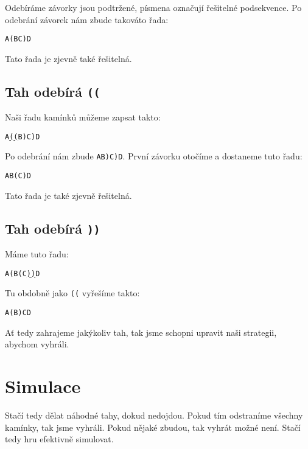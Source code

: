 \documentclass{article}
\newcommand{\bredl}{{\color{Maroon}(}}
\newcommand{\bredr}{{\color{Maroon})}}
\begin{document}
Odebíráme závorky jsou podtržené, písmena označují řešitelné podsekvence. Po odebrání závorek nám zbude takováto řada:

\begin{center}
    \texttt{{A}\bredl{B}{C}\bredr{D}}
\end{center}

Tato řada je zjevně také řešitelná.

\subsection[Tah odebírá ((]{Tah odebírá \texttt{\bredl\bredl}}

Naši řadu kamínků můžeme zapsat takto:

\begin{center}
    \texttt{{A}\underline{\bredl\bredl}{B}\bredr{C}\bredr{D}}
\end{center}

Po odebrání nám zbude \texttt{{A}{B}\bredr{C}\bredr{D}}. První závorku otočíme a dostaneme tuto řadu:

\begin{center}
    \texttt{{A}{B}\bredl{C}\bredr{D}}
\end{center}

Tato řada je také zjevně řešitelná.

\subsection[Tah odebírá ))]{Tah odebírá \texttt{\bredr\bredr}}

Máme tuto řadu:

\begin{center}
    \texttt{{A}\bredl{B}\bredl{C}\underline{\bredr\bredr}{D}}
\end{center}

Tu obdobně jako \texttt{\bredl\bredl} vyřešíme takto:

\begin{center}
    \texttt{{A}\bredl{B}\bredr{C}{D}}
\end{center}

Ať tedy zahrajeme jakýkoliv tah, tak jsme schopni upravit naši strategii, abychom vyhráli.

\section{Simulace}

Stačí tedy dělat náhodné tahy, dokud nedojdou. Pokud tím odstraníme všechny kamínky, tak jsme vyhráli. Pokud nějaké zbudou, tak vyhrát možné není. Stačí tedy hru efektivně simulovat.
\end{document}
